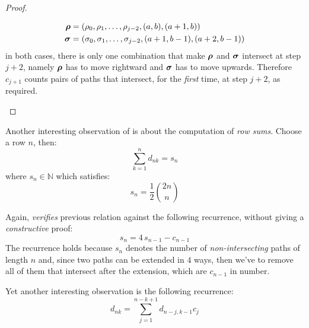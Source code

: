 \begin{proof}
\begin{itemize}
\begin{displaymath}
                \begin{split}
                    \boldsymbol{\rho}&=(\rho_{0},\rho_{1},\ldots,\rho_{j-2},(a, b),(a+1, b))\\
                    \boldsymbol{\sigma}&=(\sigma_{0},\sigma_{1},\ldots,\sigma_{j-2},(a+1,b-1),(a+2, b-1))
                \end{split}
            \end{displaymath}
            in both cases, there is only one combination that make $\boldsymbol{\rho}$ and $\boldsymbol{\sigma}$
            intersect at step $j+2$, namely $\boldsymbol{\rho}$ has to move rightward and $\boldsymbol{\sigma}$
            has to move upwards. Therefore $c_{j+1}$ counts pairs of paths that intersect,
            for the \emph{first} time, at step $j+2$, as required.
            
                 
    \end{itemize}
\end{proof}

Another interesting observation of \citeauthor{shapiro:1976} is about the computation
of \emph{row sums}. Choose a row $n$, then: 
\begin{displaymath}
    \sum_{k=1}^{n}{d_{nk}}=s_{n}
\end{displaymath}
where $s_{n}\in\mathbb{N}$ which satisfies:
\begin{displaymath}
    s_{n}=\frac{1}{2}{{2n}\choose{n}}
\end{displaymath}

Again, \citeauthor{shapiro:1976} \emph{verifies} previous relation against the
following recurrence, without giving a \emph{constructive} proof:
\begin{displaymath}
    s_{n}=4\,s_{n-1}-c_{n-1}
\end{displaymath}
The recurrence holds because $s_{n}$ denotes the number of
\emph{non-intersecting} paths of length $n$ and, since two paths can be
extended in $4$ ways, then we've to remove all of them that intersect after the
extension, which are $c_{n-1}$ in number.

Yet another interesting observation is the following recurrence:
\begin{displaymath}
    d_{nk}=\sum_{j=1}^{n-k+1}{d_{n-j,k-1}c_{j}}
\end{displaymath}

